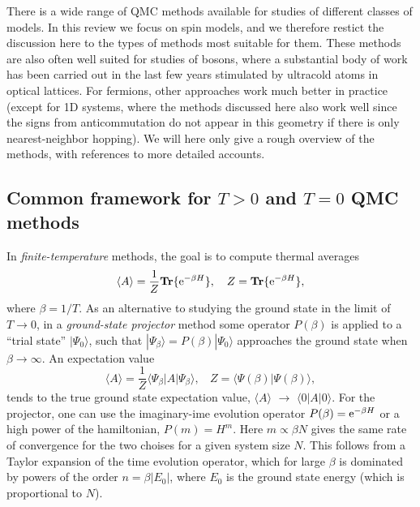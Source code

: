 \documentclass[range]{ar2e}
\begin{document}
There is a wide range of QMC methods available for studies of different classes of models. In this review we focus on spin models, and we 
therefore restict the discussion here to the types of methods most suitable for them. These methods are also often well suited for studies of 
bosons, where a substantial body of work has been carried out in the last few years stimulated by ultracold atoms in optical lattices. For 
fermions, other approaches work much better in practice (except for 1D systems, where the methods discussed here also work well since the signs 
from anticommutation do not appear in this geometry if there is only nearest-neighbor hopping). We will here only give a rough overview of the 
methods, with references to more detailed accounts.

\subsection{Common framework for $T>0$ and $T=0$ QMC methods}
\label{ss:method}

In {\it finite-temperature} methods, the goal is to compute thermal averages
\begin{equation}
\langle A\rangle = \frac{1}{Z}{\bf Tr}\{ {\rm e}^{-\beta H}\},~~~
Z = {\bf Tr}\{ {\rm e}^{-\beta H}\},
\label{za1}
\end{equation}
where $\beta=1/T$. As an alternative to studying the ground state in the limit of  $T\to 0$, in a {\it ground-state projector} method some 
operator $P(\beta)$  is applied to a ``trial state'' $|\Psi_0\rangle$, such that $|\Psi_\beta \rangle = P(\beta)|\Psi_0\rangle$ approaches the 
ground state when $\beta \to \infty$. An expectation value
\begin{equation}
\langle A\rangle = \frac{1}{Z}\langle \Psi_\beta|A|\Psi_\beta\rangle,~~~~ Z = \langle \Psi(\beta)|\Psi(\beta)\rangle,
\label{za2}
\end{equation}
tends to the true ground state expectation value, $\langle A\rangle$ $\to$ $\langle 0| A|0\rangle$. For the projector, one can use the imaginary-ime
evolution operator $P(\beta)={\rm e}^{-\beta H}$ or a high power of the hamiltonian, $P(m)=H^m$. Here $m \propto \beta N$ gives the same rate of 
convergence for the two choises for a given system size $N$. This follows from a Taylor expansion of the time evolution operator, which for large 
$\beta$ is dominated by powers of the order $n=\beta |E_0|$, where $E_0$ is the ground state energy (which is proportional to $N$).
\end{document}
